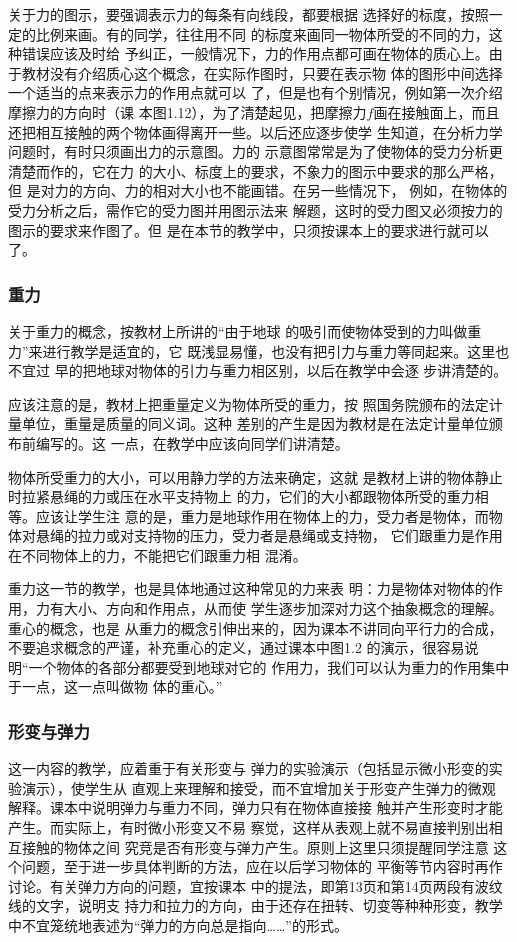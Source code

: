 关于力的图示，要强调表示力的每条有向线段，都要根据
选择好的标度，按照一定的比例来画。有的同学，往往用不同
的标度来画同一物体所受的不同的力，这种错误应该及时给
予纠正，一般情况下，力的作用点都可画在物体的质心上。由
于教材没有介绍质心这个概念，在实际作图时，只要在表示物
体的图形中间选择一个适当的点来表示力的作用点就可以
了，但是也有个别情况，例如第一次介绍摩擦力的方向时（课
本图1.12），为了清楚起见，把摩擦力$f$画在接触面上，而且
还把相互接触的两个物体画得离开一些。以后还应逐步使学
生知道，在分析力学问题时，有时只须画出力的示意图。力的
示意图常常是为了使物体的受力分析更清楚而作的，它在力
的大小、标度上的要求，不象力的图示中要求的那么严格，但
是对力的方向、力的相对大小也不能画错。在另一些情况下，
例如，在物体的受力分析之后，需作它的受力图并用图示法来
解题，这时的受力图又必须按力的图示的要求来作图了。但
是在本节的教学中，只须按课本上的要求进行就可以了。

\subsubsection{重力} 关于重力的概念，按教材上所讲的“由于地球
的吸引而使物体受到的力叫做重力”来进行教学是适宜的，它
既浅显易懂，也没有把引力与重力等同起来。这里也不宜过
早的把地球对物体的引力与重力相区别，以后在教学中会逐
步讲清楚的。

应该注意的是，教材上把重量定义为物体所受的重力，按
照国务院颁布的法定计量单位，重量是质量的同义词。这种
差别的产生是因为教材是在法定计量单位颁布前编写的。这
一点，在教学中应该向同学们讲清楚。

物体所受重力的大小，可以用静力学的方法来确定，这就
是教材上讲的物体静止时拉紧悬绳的力或压在水平支持物上
的力，它们的大小都跟物体所受的重力相等。应该让学生注
意的是，重力是地球作用在物体上的力，受力者是物体，而物
体对悬绳的拉力或对支持物的压力，受力者是悬绳或支持物，
它们跟重力是作用在不同物体上的力，不能把它们跟重力相
混淆。

重力这一节的教学，也是具体地通过这种常见的力来表
明：力是物体对物体的作用，力有大小、方向和作用点，从而使
学生逐步加深对力这个抽象概念的理解。重心的概念，也是
从重力的概念引伸出来的，因为课本不讲同向平行力的合成，
不要追求概念的严谨，补充重心的定义，通过课本中图1.2
的演示，很容易说明“一个物体的各部分都要受到地球对它的
作用力，我们可以认为重力的作用集中于一点，这一点叫做物
体的重心。”

\subsubsection{形变与弹力}
这一内容的教学，应着重于有关形变与
弹力的实验演示（包括显示微小形变的实验演示），使学生从
直观上来理解和接受，而不宜增加关于形变产生弹力的微观
解释。课本中说明弹力与重力不同，弹力只有在物体直接接
触并产生形变时才能产生。而实际上，有时微小形变又不易
察觉，这样从表观上就不易直接判别出相互接触的物体之间
究竞是否有形变与弹力产生。原则上这里只须提醒同学注意
这个问题，至于进一步具体判断的方法，应在以后学习物体的
平衡等节内容时再作讨论。有关弹力方向的问题，宜按课本
中的提法，即第13页和第14页两段有波纹线的文字，说明支
持力和拉力的方向，由于还存在扭转、切变等种种形变，教学
中不宜笼统地表述为“弹力的方向总是指向……”的形式。

